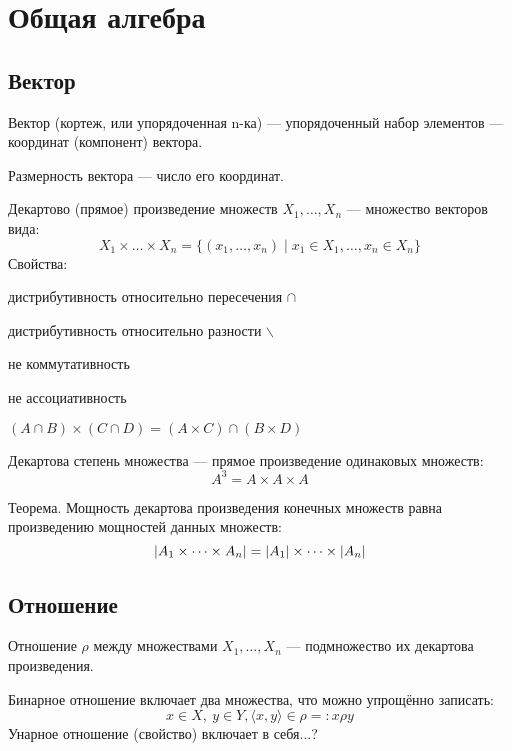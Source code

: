 \section{Общая алгебра}

\subsection{Вектор}

{\bold Вектор} {\ital (кортеж, или упорядоченная n-ка)} --- упорядоченный набор элементов --- {\ital координат (компонент)} вектора.

{\bold Размерность} вектора --- число его координат.

\begin{theorem}
{\bold Декартово} {\ital (прямое)} {\bold произведение} множеств $X_1,\dots,X_n$ --- множество векторов вида:
$$X_1\times\dots\times X_n=\{(x_1,\dots,x_n)\mid x_1\in X_1,\dots,x_n\in X_n\}$$
Свойства:
\begin{list*}
\item дистрибутивность относительно {\ital пересечения} $\cap$
\item дистрибутивность относительно {\ital разности} $\backslash$
\item {\ital *не коммутативность}
\item {\ital *не ассоциативность}
\item $(A\cap B)\times(C\cap D)=(A\times C)\cap(B\times D)$
\end{list*}
\end{theorem}
{\bold Декартова степень} множества --- прямое произведение одинаковых множеств:
$$A^3=A\times A\times A$$
\begin{theorem}
{\bold Теорема.} Мощность декартова произведения конечных множеств равна {\ital произведению мощностей} данных множеств:
$$\left|A_1\times\dots\times A_n\right|=\left|A_1\right|\times\dots\times\left|A_n\right|$$
\end{theorem}

\subsection{Отношение}

{\bold Отношение} $\rho$ между множествами $X_1,\dots,X_n$ --- подмножество их {\ital декартова произведения}.

\begin{theorem}
{\bold Бинарное} отношение включает {\ital два} множества, что можно упрощённо записать:
$$x\in X,\ y\in Y, \langle x, y\rangle\in\rho=:x\rho y$$
{\bold Унарное} отношение {\ital\color{desc} (свойство)} включает в себя...?
\end{theorem}

